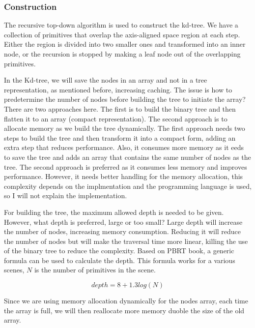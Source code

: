 \documentclass[11pt,a4paper]{article}
\begin{document}
\subsubsection{Construction}

The recursive top-down algorithm is used to construct the kd-tree. We have a collection of primitives that overlap the axis-aligned space region at each step. Either the region is divided into two smaller ones and transformed into an inner node, or the recursion is stopped by making a leaf node out of the overlapping primitives.
\\
\noindent

In the Kd-tree, we will save the nodes in an array and not in a tree representation, as mentioned before, increasing caching. The issue is how to predetermine the number of nodes before building the tree to initiate the array? There are two approaches here. The first is to build the binary tree and then flatten it to an array (compact representation). The second approach is to allocate memory as we build the tree dynamically. The first approach needs two steps to build the tree and then transform it into a compact form, adding an extra step that reduces performance. Also, it consumes more memory as it eeds to save the tree and adds an array that contains the same number of nodes as the tree. The second approach is preferred as it consumes less memory and improves performance. However, it needs better handling for the memory allocation, this complexity depends on the implmentation and the programming language is used, so I will not explain the implementation. 
\\
\noindent

For building the tree, the maximum allowed depth is needed to be given. However, what depth is preferred, large or too small? Large depth will increase the number of nodes, increasing memory consumption. Reducing it will reduce the number of nodes but will make the traversal time more linear, killing the use of the binary tree to reduce the complexity. Based on  PBRT book, a generic formula can be used to calculate the depth. This formula works for a various scenes, $N$ is the number of primitives in the scene. 


\begin{equation}
depth = 8 + 1.3log(N)
\end{equation}


Since we are using memory allocation dynamically for the nodes array, each time the array is full, we will then reallocate more memory duoble the size of the old array.
\\
\noindent
\end{document}
